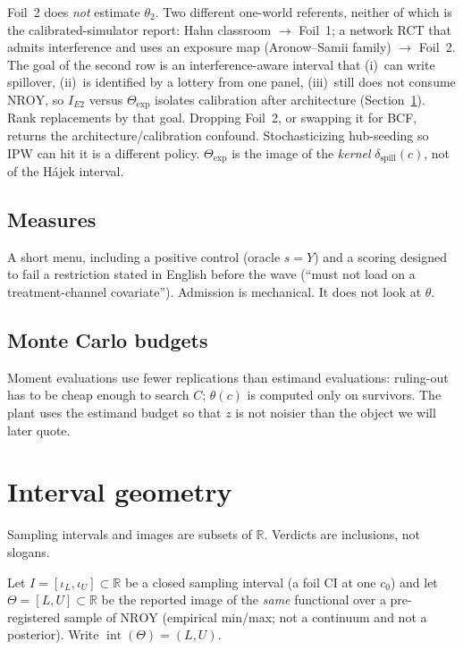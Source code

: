 \documentclass[11pt]{article}
\newcommand{\NROY}{\mathrm{NROY}}
\newcommand{\expset}{\mathrm{exp}}
\newcommand{\interior}{\operatorname{int}}
\newcommand{\Ie}{I_{E2}}
\begin{document}
Foil~2 does \emph{not} estimate $\theta_2$. Two different one-world
referents, neither of which is the calibrated-simulator report: Hahn
classroom $\to$ Foil~1; a network RCT that admits interference and uses
an exposure map (Aronow--Samii family) $\to$ Foil~2. The goal of the
second row is an interference-aware interval that (i)~can write
spillover, (ii)~is identified by a lottery from one panel, (iii)~still
does not consume $\NROY$, so $\Ie$ versus $\Theta_{\expset}$ isolates
calibration after architecture (Section~\ref{sec:geometry}). Rank
replacements by that goal. Dropping Foil~2, or swapping it for BCF,
returns the architecture/calibration confound. Stochasticizing
hub-seeding so IPW can hit it is a different policy.
$\Theta_{\expset}$ is the image of the \emph{kernel}
$\delta_{\mathrm{spill}}(c)$, not of the H\'ajek interval.

\subsection{Measures}
A short menu, including a positive control (oracle $s=Y$) and a scoring
designed to fail a restriction stated in English before the wave
(``must not load on a treatment-channel covariate''). Admission is
mechanical. It does not look at $\theta$.

\subsection{Monte Carlo budgets}
Moment evaluations use fewer replications than estimand evaluations:
ruling-out has to be cheap enough to search $C$; $\theta(c)$ is
computed only on survivors. The plant uses the estimand budget so that
$z$ is not noisier than the object we will later quote.

\section{Interval geometry}
\label{sec:geometry}

Sampling intervals and images are subsets of $\mathbb{R}$. Verdicts
are inclusions, not slogans.

Let $I=[\iota_L,\iota_U]\subset\mathbb{R}$ be a closed sampling
interval (a foil CI at one $c_0$) and let $\Theta=[L,U]\subset\mathbb{R}$
be the reported image of the \emph{same} functional over a
pre-registered sample of $\NROY$ (empirical min/max; not a continuum
and not a posterior). Write $\interior(\Theta)=(L,U)$.
\end{document}
